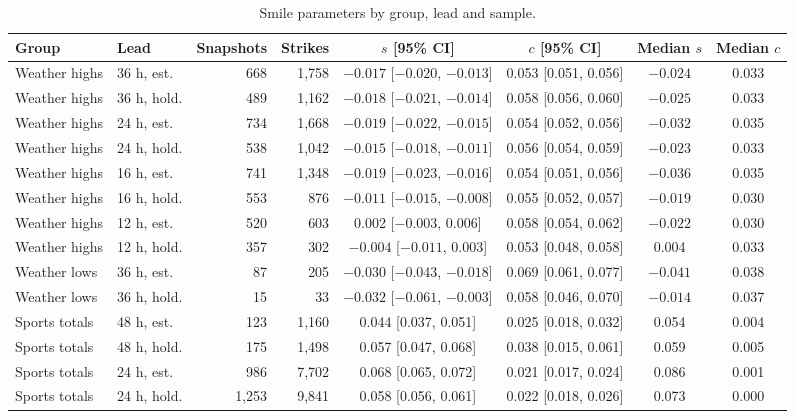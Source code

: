 \begin{table}[ht]
\centering\scriptsize
\setlength{\tabcolsep}{3.5pt}
\begin{threeparttable}
\caption{Smile parameters by group, lead and sample.}\label{tab:lad-smile-full}
\begin{tabular}{@{}llrrcccc@{}}
\toprule
Group & Lead & Snapshots & Strikes & $s$ [95\% CI] & $c$ [95\% CI] & Median $s$ & Median $c$ \\
\midrule
Weather highs & 36 h, est. & 668 & 1,758 & $-0.017$ [$-0.020$, $-0.013$] & 0.053 [0.051, 0.056] & $-0.024$ & 0.033 \\
Weather highs & 36 h, hold. & 489 & 1,162 & $-0.018$ [$-0.021$, $-0.014$] & 0.058 [0.056, 0.060] & $-0.025$ & 0.033 \\
Weather highs & 24 h, est. & 734 & 1,668 & $-0.019$ [$-0.022$, $-0.015$] & 0.054 [0.052, 0.056] & $-0.032$ & 0.035 \\
Weather highs & 24 h, hold. & 538 & 1,042 & $-0.015$ [$-0.018$, $-0.011$] & 0.056 [0.054, 0.059] & $-0.023$ & 0.033 \\
Weather highs & 16 h, est. & 741 & 1,348 & $-0.019$ [$-0.023$, $-0.016$] & 0.054 [0.051, 0.056] & $-0.036$ & 0.035 \\
Weather highs & 16 h, hold. & 553 & 876 & $-0.011$ [$-0.015$, $-0.008$] & 0.055 [0.052, 0.057] & $-0.019$ & 0.030 \\
Weather highs & 12 h, est. & 520 & 603 & 0.002 [$-0.003$, 0.006] & 0.058 [0.054, 0.062] & $-0.022$ & 0.030 \\
Weather highs & 12 h, hold. & 357 & 302 & $-0.004$ [$-0.011$, 0.003] & 0.053 [0.048, 0.058] & 0.004 & 0.033 \\
Weather lows & 36 h, est. & 87 & 205 & $-0.030$ [$-0.043$, $-0.018$] & 0.069 [0.061, 0.077] & $-0.041$ & 0.038 \\
Weather lows & 36 h, hold. & 15 & 33 & $-0.032$ [$-0.061$, $-0.003$] & 0.058 [0.046, 0.070] & $-0.014$ & 0.037 \\
Sports totals & 48 h, est. & 123 & 1,160 & 0.044 [0.037, 0.051] & 0.025 [0.018, 0.032] & 0.054 & 0.004 \\
Sports totals & 48 h, hold. & 175 & 1,498 & 0.057 [0.047, 0.068] & 0.038 [0.015, 0.061] & 0.059 & 0.005 \\
Sports totals & 24 h, est. & 986 & 7,702 & 0.068 [0.065, 0.072] & 0.021 [0.017, 0.024] & 0.086 & 0.001 \\
Sports totals & 24 h, hold. & 1,253 & 9,841 & 0.058 [0.056, 0.061] & 0.022 [0.018, 0.026] & 0.073 & 0.000 \\

\end{tabular}
\end{threeparttable}
\end{table}
